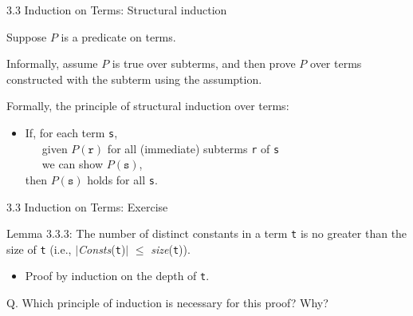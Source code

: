 \documentclass[table]{beamer}
\begin{document}
\begin{frame}[t]{3.3 Induction on Terms: Structural induction} 

Suppose $P$ is a predicate on terms.

\vspace{10pt}

Informally, assume $P$ is true over subterms, and then prove $P$ over terms constructed with the subterm using the assumption.

\vspace{10pt}

Formally, {\color{red} the principle of structural induction over terms}:
\begin{itemize}
\item If, for each term \texttt{s}, \\
 \ \ \ given $P(\texttt{r})$ for all (immediate) subterms \texttt{r} of \texttt{s} \\
 \ \ \ we can show $P(\texttt{s})$, \\
 then $P(\texttt{s})$ holds for all \texttt{s}.
\end{itemize}
 
\end{frame}


\begin{frame}[t]{3.3 Induction on Terms: Exercise} 

Lemma 3.3.3: The number of distinct constants in a term \texttt{t} is no greater than the size of \texttt{t} (i.e., $|$\textit{Consts}(\texttt{t})$|$ $\leq$ \textit{size}(\texttt{t})).
\begin{itemize}
\item
Proof by induction on the depth of \texttt{t}.
\end{itemize}

\vspace{10pt}

Q. Which principle of induction is necessary for this proof? Why?

\end{frame}
\end{document}
